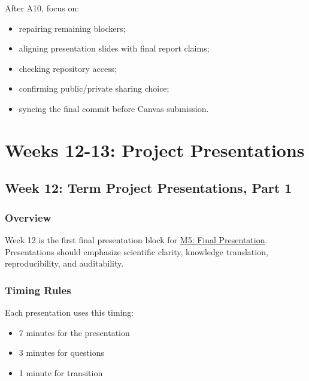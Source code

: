 \documentclass[
  letterpaper,
  DIV=11,
  numbers=noendperiod,
  oneside]{scrreprt}
\providecommand{\tightlist}{%
  \setlength{\itemsep}{0pt}\setlength{\parskip}{0pt}}
\begin{document}

After A10, focus on:

\begin{itemize}
\tightlist
\item
  repairing remaining blockers;
\item
  aligning presentation slides with final report claims;
\item
  checking repository access;
\item
  confirming public/private sharing choice;
\item
  syncing the final commit before Canvas submission.
\end{itemize}

\part{Weeks 12-13: Project Presentations}

\chapter*{Week 12: Term Project Presentations, Part
1}\label{week-12-term-project-presentations-part-1}


\section*{Overview}\label{overview-11}


Week 12 is the first final presentation block for
\href{../../milestones/m5-presentation/README.md}{M5: Final
Presentation}. Presentations should emphasize scientific clarity,
knowledge translation, reproducibility, and auditability.

\section*{Timing Rules}\label{timing-rules}


Each presentation uses this timing:

\begin{itemize}
\tightlist
\item
  7 minutes for the presentation
\item
  3 minutes for questions
\item
  1 minute for transition
\end{itemize}
\end{document}
